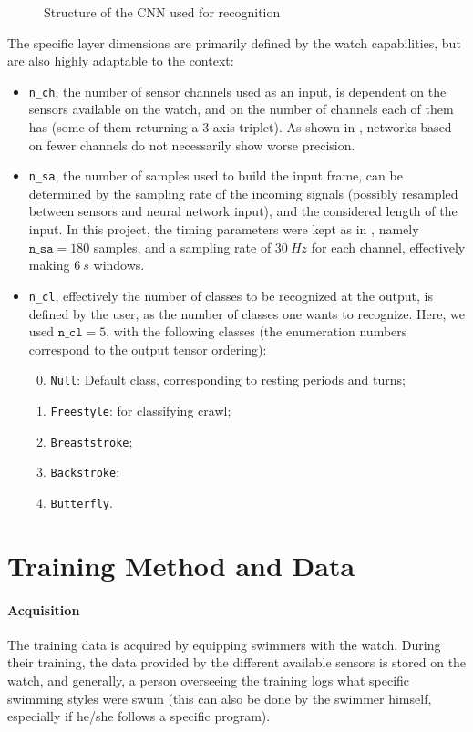 \documentclass[a4paper, oneside]{discothesis}
\begin{document}
\begin{figure}[h]
    \centering
    
    \caption{Structure of the CNN used for recognition \cite{BMSW19}}
    \label{fig:ConvNet}
\end{figure}

The specific layer dimensions are primarily defined by the watch capabilities, but are also highly adaptable to the context:
\begin{itemize}
\item \texttt{n\_ch}, the number of sensor channels used as an input, is dependent on the sensors available on the watch, and on the number of channels each of them has (some of them returning a 3-axis triplet). As shown in \cite{WANG19}, networks based on fewer channels do not necessarily show worse precision. 
\item \texttt{n\_sa}, the number of samples used to build the input frame, can be determined by the sampling rate of the incoming signals (possibly resampled between sensors and neural network input), and the considered length of the input. In this project, the timing parameters were kept as in \cite{BMSW19}, namely $\mathtt{n\_sa}=180$ samples, and a sampling rate of $30~Hz$ for each channel, effectively making $6~s$ windows.
\item \texttt{n\_cl}, effectively the number of classes to be recognized at the output, is defined by the user, as the number of classes one wants to recognize. Here, we used $\mathtt{n\_cl}=5$, with the following classes (the enumeration numbers correspond to the output tensor ordering):
\begin{enumerate}
    \setcounter{enumi}{-1}
    \item \texttt{Null}: Default class, corresponding to resting periods and turns; 
    \item \texttt{Freestyle}: for classifying crawl;
    \item \texttt{Breaststroke};
    \item \texttt{Backstroke};
    \item \texttt{Butterfly}.
\end{enumerate}
\end{itemize}


\section{Training Method and Data}
\paragraph{Acquisition} The training data is acquired by equipping swimmers with the watch. During their training, the data provided by the different available sensors is stored on the watch, and generally, a person overseeing the training logs what specific swimming styles were swum (this can also be done by the swimmer himself, especially if he/she follows a specific program).
\end{document}
